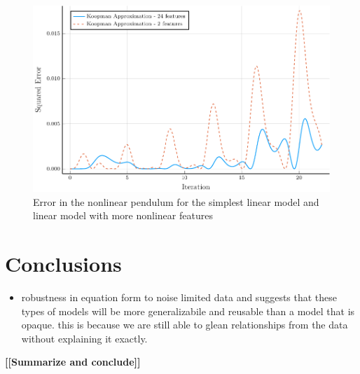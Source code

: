 \documentclass{article}
\newcommand{\todo}[1]{\textbf{[[#1]]}}
\begin{document}
\begin{figure}
\vskip 0.2in
\begin{center}
\centerline{\includegraphics[width=\columnwidth]{./figures/pendulum}}
\caption{Error in the nonlinear pendulum for the simplest linear model and linear model with more nonlinear features}
\label{fig:pendulum}
\end{center}
\vskip -0.2in
\end{figure}

\section{Conclusions}

\begin{itemize}
    \item robustness in equation form to noise limited data and suggests that these types of models will be more generalizabile and reusable than a model that is opaque. this is because we are still able to glean relationships from the data without explaining it exactly.
\end{itemize}

\todo{Summarize and conclude}




\nocite{langley00}



\end{document}
